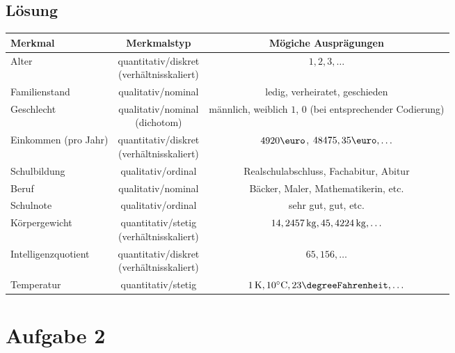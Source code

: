 \documentclass{exercise}
\begin{document}
    \subsection*{Lösung}
    \begin{center}
        \begin{tabular}{lcc}
            \toprule
            Merkmal & Merkmalstyp & Mögiche Ausprägungen\\
            \midrule
            Alter & \makecell{quantitativ/diskret\\(verhältnisskaliert)} & \(1, 2, 3, \ldots\)\\
            Familienstand & qualitativ/nominal & ledig, verheiratet, geschieden\\
            Geschlecht & \makecell{qualitativ/nominal\\(dichotom)} & \makecell{männlich, weiblich\\\(1\), \(0\) (bei entsprechender Codierung)}\\
            Einkommen (pro Jahr) & \makecell{quantitativ/diskret\\(verhältnisskaliert)} & \(4920\text{\euro}\), \(48475,35\text{\euro}, \ldots\)\\
            Schulbildung & qualitativ/ordinal & Realschulabschluss, Fachabitur, Abitur\\
            Beruf & qualitativ/nominal & Bäcker, Maler, Mathematikerin, etc.\\
            Schulnote & qualitativ/ordinal & sehr gut, gut, etc.\\
            Körpergewicht & \makecell{quantitativ/stetig\\(verhältnisskaliert)} & \(14,2457\,\si{\kilo\gram}, 45,4224\,\si{\kilo\gram}, \ldots\)\\
            Intelligenzquotient & \makecell{quantitativ/diskret\\(verhältnisskaliert)} & \(65, 156, \ldots\)\\
            Temperatur & quantitativ/stetig & \(1\sis{\kelvin}, 10\si{\degreeCelsius}, 23\si{\degreeFahrenheit}, \ldots\)\\
            \bottomrule
        \end{tabular}
    \end{center}


    \section*{Aufgabe 2}
\end{document}
